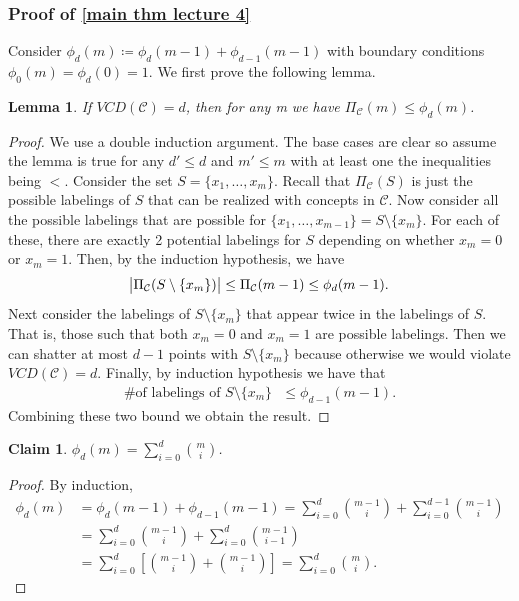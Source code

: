 \documentclass[12pt, letterpaper]{article}
\numberwithin{equation}{section} %
\newcommand{\mc}{\mathcal}
\newtheorem{lemma}[theorem]{Lemma}
\newtheorem{claim}[theorem]{Claim}
\theoremstyle{definition}
\theoremstyle{remark}
\begin{document}
\subsubsection*{Proof of \cref{main thm lecture 4}}
Consider $\phi_d(m) \coloneqq \phi_d(m-1) + \phi_{d-1}(m-1)$ with boundary conditions $\phi_0(m)=\phi_d(0)=1$.  We first prove the following lemma.
\begin{lemma}
    If $VCD(\mc C)= d$, then for any m we have $\Pi_{\mc C}(m) \leq \phi_d(m)$.
\end{lemma}
\begin{proof}
   We use a double induction argument. The base cases are clear so assume the lemma is true for any $d'\leq d$ and $m'\leq m$ with at least one the inequalities being $<$. Consider the set $S=\lbrace x_1,\ldots,x_m\rbrace$. Recall that $\Pi_{\mc C}(S)$ is just the possible labelings of $S$ that can be realized with concepts in $\mc C$. Now consider all the possible labelings that are possible for $\lbrace x_1,\ldots,x_{m-1}\rbrace = S\setminus \lbrace x_m\rbrace$. For each of these, there are exactly 2 potential labelings for $S$ depending on whether $x_m = 0$ or $x_m = 1$. Then, by the induction hypothesis, we have
   \begin{align}
   \abs{\Pi_{\mc C}(S\setminus\{x_m\})} \leq \Pi_{\mc C}(m-1) \leq \phi_d(m-1).
   \end{align}
   Next consider the labelings of $S\setminus \lbrace x_m\rbrace$ that appear twice in the labelings of $S$. That is, those such that both $x_m = 0$ and $x_m = 1$ are possible labelings. Then we can shatter at most $d-1$ points with $S\setminus \lbrace x_m\rbrace$ because otherwise we would violate $VCD(\mc C) = d$. Finally, by induction hypothesis we have that
   \begin{align}
        \textrm{\# of labelings of $S\setminus \lbrace x_m\rbrace$ }\leq \phi_{d-1}(m-1).
   \end{align}
   Combining these two bound we obtain the result.
\end{proof}

\begin{claim}
    $\phi_d(m) = \sum\limits_{i=0}^d\binom{m}{i}$.
\end{claim}
\begin{proof}
    By induction,
    \begin{align}
        \phi_d(m) &= \phi_d(m-1) + \phi_{d-1}(m-1) = \sum\limits_{i=0}^d\binom{m-1}{i} + \sum\limits_{i=0}^{d-1}\binom{m-1}{i}\\
        &= \sum\limits_{i=0}^d\binom{m-1}{i} + \sum\limits_{i=0}^{d}\binom{m-1}{i-1}\\
        &= \sum\limits_{i=0}^d\left[\binom{m-1}{i} + \binom{m-1}{i}\right] = \sum\limits_{i=0}^d\binom{m}{i}.
    \end{align}
\end{proof}
\end{document}
